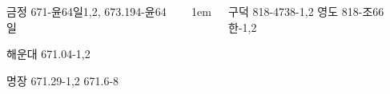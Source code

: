 \documentclass[	20pt, 
							a1paper, 
							portrait, %
							margin=0mm, %
							innermargin=10mm,  		%
							colspace=5mm, 
							subcolspace=0mm
							]{tikzposter}
\begin{document}
\begin{columns}
{\begin{LARGE}
금정 671-윤64일1,2,  673.194-윤64일

해운대  671.04-1,2    

명장    671.29-1,2   671.6-8
				\end{LARGE}
			}



			{
					\setlength{\leftmargini}{7em}
					\setlength{\labelsep} {1em}
				\begin{LARGE}
구덕    818-4738-1,2   	%
영도    818-조66한-1,2 	%

				\end{LARGE}
			}


%



\end{columns}
\end{document}
